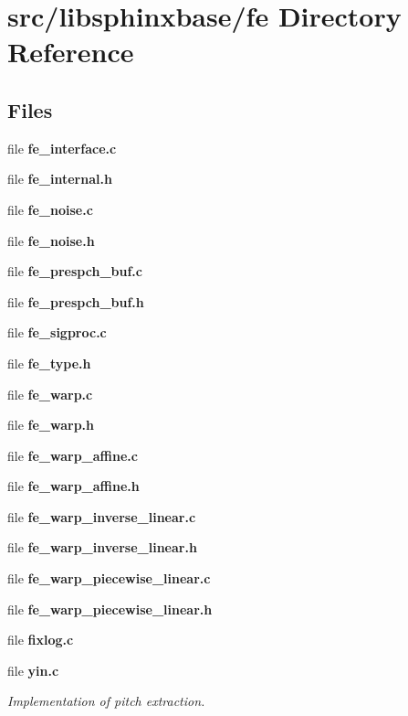 \section{src/libsphinxbase/fe Directory Reference}
\label{dir_b1d999ee57d4a6d8d8bcab6209918fc2}
\subsection*{Files}
\begin{DoxyCompactItemize}
\item 
file {\bfseries fe\-\_\-interface.\-c}
\item 
file {\bfseries fe\-\_\-internal.\-h}
\item 
file {\bfseries fe\-\_\-noise.\-c}
\item 
file {\bfseries fe\-\_\-noise.\-h}
\item 
file {\bfseries fe\-\_\-prespch\-\_\-buf.\-c}
\item 
file {\bfseries fe\-\_\-prespch\-\_\-buf.\-h}
\item 
file {\bfseries fe\-\_\-sigproc.\-c}
\item 
file {\bfseries fe\-\_\-type.\-h}
\item 
file {\bfseries fe\-\_\-warp.\-c}
\item 
file {\bfseries fe\-\_\-warp.\-h}
\item 
file {\bfseries fe\-\_\-warp\-\_\-affine.\-c}
\item 
file {\bfseries fe\-\_\-warp\-\_\-affine.\-h}
\item 
file {\bfseries fe\-\_\-warp\-\_\-inverse\-\_\-linear.\-c}
\item 
file {\bfseries fe\-\_\-warp\-\_\-inverse\-\_\-linear.\-h}
\item 
file {\bfseries fe\-\_\-warp\-\_\-piecewise\-\_\-linear.\-c}
\item 
file {\bfseries fe\-\_\-warp\-\_\-piecewise\-\_\-linear.\-h}
\item 
file {\bfseries fixlog.\-c}
\item 
file {\bf yin.\-c}
\begin{DoxyCompactList}\small\item\em Implementation of pitch extraction. \end{DoxyCompactList}\end{DoxyCompactItemize}
